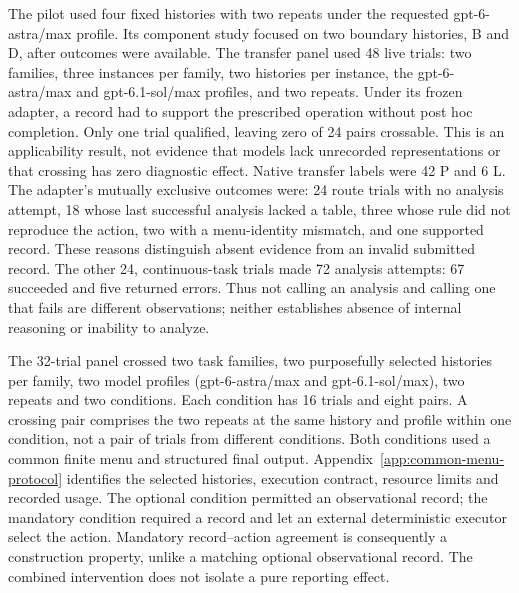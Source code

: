 The pilot used four fixed histories with two repeats under the requested
gpt-6-astra/max profile. Its component study
focused on two boundary histories, B and D, after outcomes were available.
The transfer panel used 48 live trials: two families, three instances per
family, two histories per instance, the gpt-6-astra/max and
gpt-6.1-sol/max profiles, and two repeats. Under its frozen adapter, a record had to
support the prescribed operation without post hoc completion. Only one trial
qualified, leaving zero of 24 pairs crossable. This is an applicability result,
not evidence that models lack unrecorded representations or that crossing has
zero diagnostic effect. Native transfer labels were 42 P and 6 L. The adapter's mutually exclusive
outcomes were: 24 route trials with no analysis attempt, 18 whose last successful
analysis lacked a table, three whose rule did not reproduce the action, two
with a menu-identity mismatch, and one supported record. These reasons
distinguish absent evidence from an invalid submitted record.
The other 24, continuous-task trials made 72 analysis attempts: 67 succeeded
and five returned errors. Thus not calling an analysis and calling one that
fails are different observations; neither establishes absence of internal
reasoning or inability to analyze.

The 32-trial panel crossed two task families, two purposefully selected
histories per family, two model profiles (gpt-6-astra/max and gpt-6.1-sol/max),
two repeats and two conditions. Each condition has 16 trials and eight pairs.
A crossing pair comprises the two repeats at the same history and profile
within one condition, not a pair of trials from different conditions.
Both conditions used a common finite menu and structured final output.
Appendix~\ref{app:common-menu-protocol} identifies the selected histories,
execution contract, resource limits and recorded usage.
The optional condition permitted an observational record; the mandatory
condition required a record and let an external deterministic executor select
the action. Mandatory record--action agreement is consequently a construction
property, unlike a matching optional observational record. The combined
intervention does not isolate a pure reporting effect.

